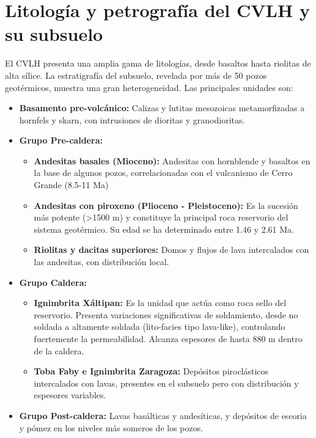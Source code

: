\section{Litología y petrografía del CVLH y su subsuelo}
El CVLH presenta una amplia gama de litologías, desde basaltos hasta riolitas de alta sílice. La estratigrafía del subsuelo, revelada por más de 50 pozos geotérmicos, muestra una gran heterogeneidad. Las principales unidades son:
\begin{itemize}
    \item \textbf{Basamento pre-volcánico:} Calizas y lutitas mesozoicas metamorfizadas a hornfels y skarn, con intrusiones de dioritas y granodioritas.
    \item \textbf{Grupo Pre-caldera:}
    \begin{itemize}
        \item \textbf{Andesitas basales (Mioceno):} Andesitas con hornblende y basaltos en la base de algunos pozos, correlacionadas con el vulcanismo de Cerro Grande (8.5-11 Ma)
        \item \textbf{Andesitas con piroxeno (Plioceno - Pleistoceno):} Es la sucesión más potente (>1500 m) y constituye la principal roca reservorio del sistema geotérmico. Su edad se ha determinado entre 1.46 y 2.61 Ma.
        \item \textbf{Riolitas y dacitas superiores:} Domos y flujos de lava intercalados con las andesitas, con distribución local.
    \end{itemize}

    \item \textbf{Grupo Caldera:}
    \begin{itemize}
        \item \textbf{Ignimbrita Xáltipan:} Es la unidad que actúa como roca sello del reservorio. Presenta variaciones significativas de soldamiento, desde no soldada a altamente soldada (lito-facies tipo lava-like), controlando fuertemente la permeabilidad. Alcanza espesores de hasta 880 m dentro de la caldera.
        \item \textbf{Toba Faby e Ignimbrita Zaragoza:} Depósitos piroclásticos intercalados con lavas, presentes en el subsuelo pero con distribución y espesores variables.
    \end{itemize}

    \item \textbf{Grupo Post-caldera:} Lavas basálticas y andesíticas, y depósitos de escoria y pómez en los niveles más someros de los pozos.
\end{itemize}

